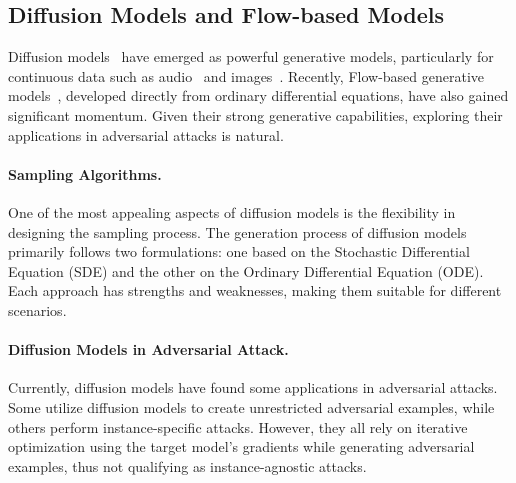 \subsection{Diffusion Models and Flow-based Models}
Diffusion models~\cite{sohl2015deep,ho2020denoising,song2020denoising,song2020score} have emerged as powerful generative models, particularly for continuous data such as audio~\cite{huang2023make} and images~\cite{rombach2022high}. Recently, Flow-based generative models~\cite{lipmanflow,esser2024scaling,liuflow}, developed directly from ordinary differential equations, have also gained significant momentum. Given their strong generative capabilities, exploring their applications in adversarial attacks is natural.

\paragraph{Sampling Algorithms.}
One of the most appealing aspects of diffusion models is the flexibility in designing the sampling process. The generation process of diffusion models primarily follows two formulations: one based on the Stochastic Differential Equation (SDE) and the other on the Ordinary Differential Equation (ODE). Each approach has strengths and weaknesses, making them suitable for different scenarios.

\paragraph{Diffusion Models in Adversarial Attack.} Currently, diffusion models have found some applications in adversarial attacks. Some utilize diffusion models to create unrestricted adversarial examples\cite{chen2023advdiffuser, dai2025advdiff}, while others perform instance-specific attacks\cite{xue2023diffusion, chen2024diffusion}. However, they all rely on iterative optimization using the target model's gradients while generating adversarial examples, thus not qualifying as instance-agnostic attacks.
